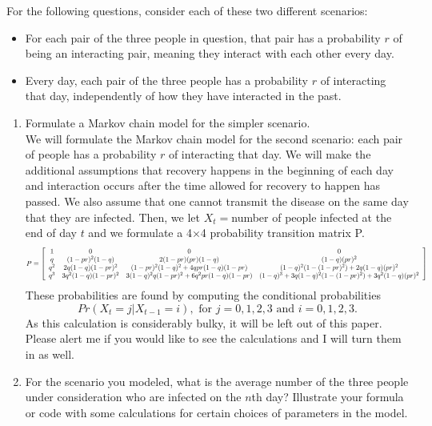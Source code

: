 \documentclass[12pt]{article}
\numberwithin{equation}{section}
\begin{document}
\begin{enumerate}
For the following questions, consider each of these two different scenarios:
\begin{itemize}
\item For each pair of the three people in question, that pair has a probability $r$ of being an interacting pair, meaning they interact with each other every day.
\item Every day, each pair of the three people has a probability $r$ of interacting that day, independently of how they have interacted in the past.
\end{itemize}
\begin{enumerate}
\item Formulate a Markov chain model for the simpler scenario.\\

We will formulate the Markov chain model for the second scenario: each pair of people has a probability $r$ of interacting that day. We will make the additional assumptions that recovery happens in the beginning of each day and interaction occurs after the time allowed for recovery to happen has passed. We also assume that one cannot transmit the disease on the same day that they are infected. Then, we let $X_t=$number of people infected at the end of day $t$ and we formulate a 4$\times$4 probability transition matrix P.
\newcommand\scalemath[2]{\scalebox{#1}{\mbox{\ensuremath{\displaystyle #2}}}}
\[\scalemath{0.65}{P=
\left[\begin{array}{cccc}1&0&0&0\\q&(1-pr)^2(1-q)&2(1-pr)(pr)(1-q)&(1-q)(pr)^2\\q^2&2q(1-q)(1-pr)^2&(1-pr)^2(1-q)^2+4qpr(1-q)(1-pr)&(1-q)^2(1-(1-pr)^2)+2q(1-q)(pr)^2\\q^3&3q^2(1-q)(1-pr)^2&3(1-q)^2q(1-pr)^2+6q^2pr(1-q)(1-pr)&(1-q)^3+3q(1-q)^2(1-(1-pr)^2)+3q^2(1-q)(pr)^2\end{array}\right]}\]
These probabilities are found by computing the conditional probabilities
$$Pr(X_t=j|X_{t-1}=i), \text{ for }j=0,1,2,3\text{ and }i=0,1,2,3.$$
As this calculation is considerably bulky, it will be left out of this paper. Please alert me if you would like to see the calculations and I will turn them in as well.

\item For the scenario you modeled, what is the average number of the three people under consideration who are infected on the $n$th day? Illustrate your formula or code with some calculations for certain choices of parameters in the model.\\


\end{enumerate}
\end{enumerate}
\end{document}
